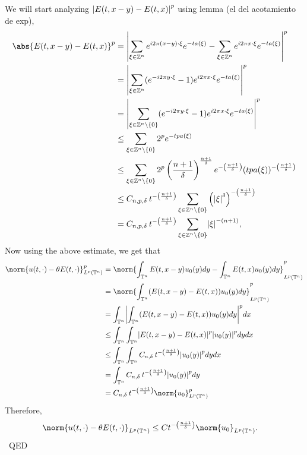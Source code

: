 \documentclass[11pt]{article}
\DeclarePairedDelimiter{\vabs}{\lvert}{\rvert}
\newenvironment{proof}{{\sc Proof:}}{~\hfill QED}
\newcommand{\T}{\mathbb{T}}
\newcommand{\LT}[1]{L^{#1}(\mathbb{T}^n)}
\begin{document}
\begin{proof}
	We will start analyzing $\vabs*{E(t,x-y) - E(t,x)}^p$ using lemma (el del acotamiento de exp),
	\begin{align*}
		\abs{E(t,x-y)-E(t,x)}^p &= \vabs*{\sum_{\xi \in \mathbb{Z}^n} e^{i2\pi (x-y)\cdot \xi} e^{-ta(\xi)}-\sum_{\xi \in \mathbb{Z}^n} e^{i2\pi x\cdot \xi} e^{-ta(\xi)}}^p\\
		&= \vabs*{\sum_{\xi \in \mathbb{Z}^n} (e^{-i2\pi y\cdot \xi} -1)e^{i2\pi x\cdot \xi} e^{-ta(\xi)}}^p\\
		&= \vabs*{\sum_{\xi \in \mathbb{Z}^n \setminus \{0\}} (e^{-i2\pi y\cdot \xi} -1)e^{i2\pi x\cdot \xi} e^{-ta(\xi)}}^p\\
		&\le \sum_{\xi \in \mathbb{Z}^n \setminus \{0\}} 2^pe^{-tpa(\xi)}\\
		&\le \sum_{\xi \in \mathbb{Z}^n \setminus \{0\}} 2^p\left(\frac{n+1}{\delta}\right)^{\frac{n+1}{\delta}} e^{-\left(\frac{n+1}{\delta}\right)}(tpa(\xi))^{-\left(\frac{n+1}{\delta}\right)}\\
		&\le C_{n,p, \delta}\hspace{2pt} t^{-\left(\frac{n+1}{\delta}\right)}\sum_{\xi \in \mathbb{Z}^n \setminus \{0\}} \left(\vabs*{\xi}^{\delta}\right)^{-\left(\frac{n+1}{\delta}\right)}\\
		&=C_{n,p, \delta}\hspace{2pt} t^{-\left(\frac{n+1}{\delta}\right)}\sum_{\xi \in \mathbb{Z}^n \setminus \{0\}} \vabs*{\xi}^{-(n+1)},
	\end{align*}
	Now using the above estimate, we get that
	\begin{align*}
		\norm{u(t,\cdot)- \theta E(t,\cdot)}_{\LT{p}}^{p} &= \norm{\int_{\mathbb{T}^n} E(t,x-y)u_0 (y) dy - \int_{\mathbb{T}^n} E(t,x)u_0 (y)dy}_{\LT{p}}^{p}\\
		&= \norm{\int_{\mathbb{T}^n}(E(t,x-y)-E(t,x))u_0 (y)dy}_{\LT{p}}^p\\
		&= \int_{\mathbb{T}^n} \vabs*{\int_{\mathbb{T}^n}(E(t,x-y)-E(t,x))u_0 (y)dy}^p dx\\
		&\le \int_{\mathbb{T}^n} \int_{\mathbb{T}^n} \vabs*{E(t,x-y) - E(t,x)}^p \vabs*{u_0 (y)}^p dydx\\
		&\le \int_{\mathbb{T}^n} \int_{\mathbb{T}^n} C_{n,\delta}\hspace{2pt} t^{-\left(\frac{n+1}{\delta}\right)} \vabs*{u_0 (y)}^p dydx\\
		&= \int_{\T^n} C_{n,\delta}\hspace{2pt} t^{-\left(\frac{n+1}{\delta}\right)} \vabs*{u_0 (y)}^p dy\\
		&=C_{n,\delta}\hspace{2pt} t^{-\left(\frac{n+1}{\delta}\right)} \norm{u_0}_{\LT{p}}^p
	\end{align*}
	Therefore,
	\begin{align*}
		\norm{u(t,\cdot)- \theta E(t,\cdot)}_{\LT{p}} &\le Ct^{-\left(\frac{n+1}{\delta}\right)} \norm{u_0}_{\LT{p}}.
	\end{align*}
\end{proof}


\end{document}
